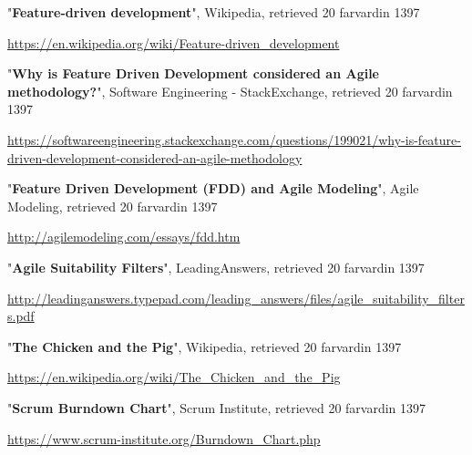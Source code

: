 \begin{thebibliography}{8}
\latin


"\textbf{Feature-driven development}", Wikipedia, retrieved 20 farvardin 1397

\url{https://en.wikipedia.org/wiki/Feature-driven_development}



"\textbf{Why is Feature Driven Development considered an Agile methodology?}", Software Engineering - StackExchange, retrieved 20 farvardin 1397

\url{https://softwareengineering.stackexchange.com/questions/199021/why-is-feature-driven-development-considered-an-agile-methodology}



"\textbf{Feature Driven Development (FDD) and Agile Modeling}", Agile Modeling, retrieved 20 farvardin 1397

\url{http://agilemodeling.com/essays/fdd.htm}



"\textbf{Agile Suitability Filters}", LeadingAnswers, retrieved 20 farvardin 1397

\url{http://leadinganswers.typepad.com/leading_answers/files/agile_suitability_filters.pdf}



"\textbf{The Chicken and the Pig}", Wikipedia, retrieved 20 farvardin 1397

\url{https://en.wikipedia.org/wiki/The_Chicken_and_the_Pig}



"\textbf{Scrum Burndown Chart}", Scrum Institute, retrieved 20 farvardin 1397

\url{https://www.scrum-institute.org/Burndown_Chart.php}



\end{thebibliography}
